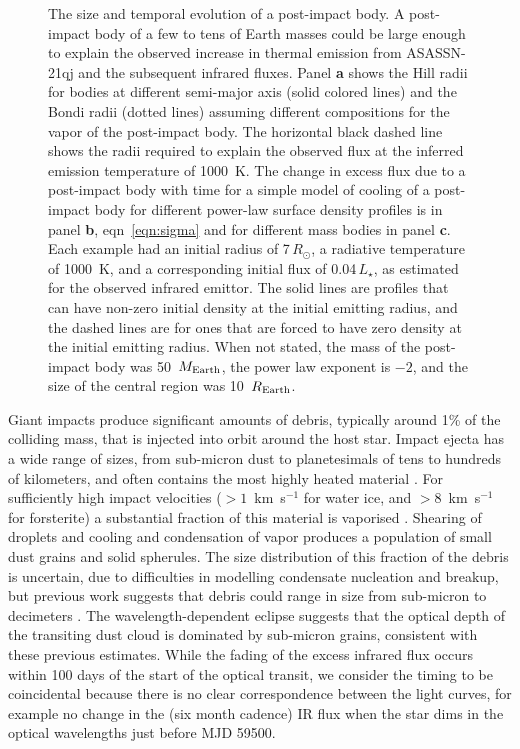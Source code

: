 \documentclass[sn-nature]{sn-jnl}%
\begin{document}
\begin{figure}
\begin{centering}
\caption{The size and temporal evolution of a post-impact body.
%
A post-impact body of a few to tens of Earth masses could be large enough to explain the observed increase in thermal emission from ASASSN-21qj and the subsequent infrared fluxes.
%
Panel {\bf a} shows the Hill radii for bodies at different semi-major axis (solid colored lines) and the Bondi radii (dotted lines) assuming different compositions for the vapor of the post-impact body.
%
The horizontal black dashed line shows the radii required to explain the observed flux at the inferred emission temperature of 1000~K. 
%
The change in excess flux due to a post-impact body with time for a simple model of cooling of a post-impact body for different power-law surface density profiles is in panel {\bf b}, eqn~\ref{eqn:sigma} and for different mass bodies in panel {\bf c}.
%
Each example had an initial radius of 7\,$R_\odot$, a radiative temperature of 1000~K, and a corresponding initial flux of 0.04\,$L_\star$, as estimated for the observed infrared emittor.
%
The solid lines are profiles that can have non-zero initial density at the initial emitting radius, and the dashed lines are for ones that are forced to have zero density at the initial emitting radius.
%
When not stated, the mass of the post-impact body was 50~$M_{\rm Earth}$, the power law exponent is $-2$, and the size of the central region was 10~$R_{\rm Earth}$.
}
\label{fig:Hill_Bondi_R}
\end{centering}
\end{figure}

Giant impacts produce significant amounts of debris, typically around 1\% of the colliding mass, that is injected into orbit around the host star\cite{Canup2001,Lock18}.
%
Impact ejecta has a wide range of sizes, from sub-micron dust to planetesimals of tens to hundreds of kilometers, and often contains the most highly heated material \cite{Benz2008_Mercury_book,Leinhardt2015,Carter2020a}.
%
For sufficiently high impact velocities ($>1$~km~s$^{-1}$ for water ice, and $>8$~km~s$^{-1}$ for forsterite) a substantial fraction of this material is vaporised \cite{Stewart2008,Davies2020,Carter2020a}.
%
Shearing of droplets and cooling and condensation of vapor produces a population of small dust grains and solid spherules.
%
The size distribution of this fraction of the debris is uncertain, due to difficulties in modelling condensate nucleation and breakup, but previous work suggests that debris could range in size from sub-micron to decimeters \cite{Benz2008_Mercury_book,Johnson2015}.
%
The wavelength-dependent eclipse suggests that the optical depth of the transiting dust cloud is dominated by sub-micron grains, consistent with these previous estimates.
%
While the fading of the excess infrared flux occurs within 100 days of the start of the optical transit, we consider the timing to be coincidental because there is no clear correspondence between the light curves, for example no  change in the (six month cadence) IR flux when the star dims in the optical wavelengths just before MJD 59500.
\end{document}
